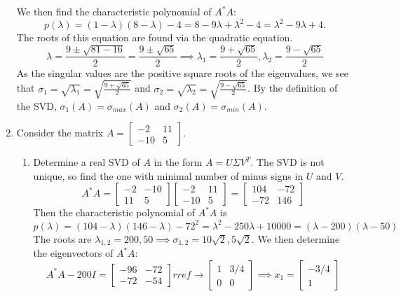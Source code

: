\documentclass[12pt]{article}
\numberwithin{equation}{section}
\begin{document}
\begin{enumerate}
    We then find the characteristic polynomial of $A^*A$:
    $$p(\lambda)=(1-\lambda)(8-\lambda)-4=8-9\lambda+\lambda^2-4=\lambda^2-9\lambda+4.$$
    The roots of this equation are found via the quadratic equation.
    $$\lambda=\frac{9\pm\sqrt{81-16}}{2}=\frac{9\pm\sqrt{65}}{2}\implies \lambda_1=\frac{9+\sqrt{65}}{2},\lambda_2=\frac{9-\sqrt{65}}{2}$$
    As the singular values are the positive square roots of the eigenvalues, we see that $\sigma_1=\sqrt{\lambda_1}=\sqrt{\frac{9+\sqrt{65}}{2}}$ and $\sigma_2=\sqrt{\lambda_2}=\sqrt{\frac{9-\sqrt{65}}{2}}$. By the definition of the SVD, $\sigma_1(A)=\sigma_{max}(A)$ and $\sigma_2(A)=\sigma_{min}(A)$.
\item Consider the matrix $A=\left[\begin{array}{cc}-2&11\\-10&5\end{array}\right]$.
    \begin{enumerate}
    \item Determine a real SVD of $A$ in the form $A=U\Sigma V^T$. The SVD is not unique, so find the one with minimal number of minus signs in $U$ and $V$.\\
        $$A^*A=\left[\begin{array}{cc}-2&-10\\11&5\end{array}\right]\left[\begin{array}{cc}-2&11\\-10&5\end{array}\right]=\left[\begin{array}{cc}104&-72\\-72&146\end{array}\right]$$
        Then the characteristic polynomial of $A^*A$ is
        $$p(\lambda)=(104-\lambda)(146-\lambda)-72^2=\lambda^2-250\lambda+10000=(\lambda-200)(\lambda-50)$$
        The roots are $\lambda_{1,2}=200,50\implies \sigma_{1,2}=10\sqrt{2},5\sqrt{2}$.
        We then determine the eigenvectors of $A^*A$:
        $$A^*A-200I=\left[\begin{array}{cc}-96&-72\\-72&-54\end{array}\right]rref\to\left[\begin{array}{cc}1&3/4\\0&0\end{array}\right]\implies x_1=\left[\begin{array}{c}-3/4\\1\end{array}\right]$$

\end{enumerate}
\end{enumerate}
\end{document}
